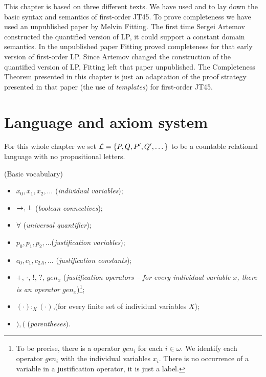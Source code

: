 \qquad This chapter is based on three different texts. We have used \cite{Artemov11} and \cite{Fitting14} to lay down the basic syntax and semantics of first-order JT45. To prove completeness we have used an unpublished paper by Melvin Fitting. The first time Sergei Artemov constructed the quantified version of LP, it could support a constant domain semantics. In the unpublished paper Fitting proved completeness for that early version of first-order LP. Since Artemov changed the construction of the quantified version of LP, Fitting left that paper unpublished. The Completeness Theorem presented in this chapter is just an adaptation of the proof strategy presented in that paper (the use of \textit{templates}) for first-order JT45. 



\section{Language and axiom system}


\qquad For this whole chapter we set $\mathcal{L} = \{P, Q, P^{\prime}, Q^{\prime}, \dots \}$ to be a countable relational language with no propositional letters.


\begin{defn} (Basic vocabulary)
	
	\begin{itemize} 
		\item $x_{0}, x_{1}, x_{2}, \dots$ (\textit{individual variables});
		\item $\rightarrow, \bot$ (\textit{boolean connectives});
		\item $\forall$ (\textit{universal quantifier});
		\item $p_{0}, p_{1}, p_{2}, \dots$(\textit{justification variables});
		\item $c_{0}, c_{1}, c_{2A}, \dots$ (\textit{justification constants});
		\item $+$, $\cdot$, $!$, $?$, $gen_{x}$ (\textit{justification operators -- for every individual variable $x$, there is an operator $gen_{x}$})\footnote{To be precise, there is a operator $gen_{i}$ for each $i \in \omega$. We identify each operator $gen_{i}$ with the individual variables $x_{i}$. There is no occurrence of a variable in a justification operator, it is just a label.};
		\item $(\cdot):_{X} (\cdot)$,(for every finite set of individual variables $X$);
		\item $),($ (\textit{parentheses}).
	\end{itemize}
\end{defn}

